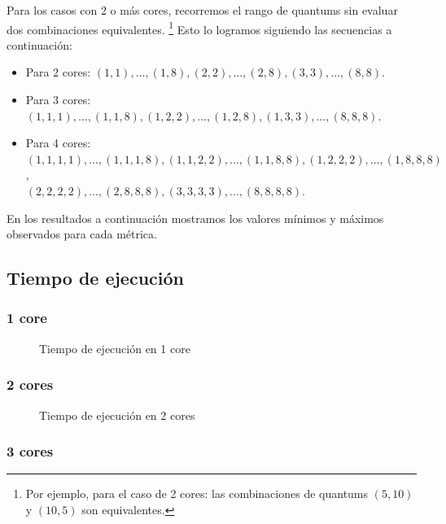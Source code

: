 \documentclass[a4paper,10pt,twoside]{article}
\begin{document}
Para los casos con 2 o más cores, recorremos el rango de quantums sin evaluar dos combinaciones equivalentes. \footnote{Por ejemplo, para el caso de 2 cores: las combinaciones de quantums $(5, 10)$ y $(10, 5)$ son equivalentes.} Esto lo logramos siguiendo las secuencias a continuación:

\begin{itemize}
	\item{
		Para 2 cores:
		$(1, 1), \ldots, (1, 8),
		 (2, 2), \ldots, (2, 8),
		 (3, 3), \ldots, (8, 8)$.
	}
	\item{
		Para 3 cores:
		$(1, 1, 1), \ldots, (1, 1, 8),
		 (1, 2, 2), \ldots, (1, 2, 8),
		 (1, 3, 3), \ldots, (8, 8, 8)$.
	}	
	\item{
		Para 4 cores:
		$(1, 1, 1, 1), \ldots, (1, 1, 1, 8),
		 (1, 1, 2, 2), \ldots, (1, 1, 8, 8),
		 (1, 2, 2, 2), \ldots, (1, 8, 8, 8)$, \\
		\hspace*{5.7em}
		$(2, 2, 2, 2), \ldots, (2, 8, 8, 8),
		 (3, 3, 3, 3), \ldots, (8, 8, 8, 8)$.
	}
\end{itemize}

En los resultados a continuación mostramos los valores mínimos y máximos observados para cada métrica.


\subsection{Tiempo de ejecución}


\subsubsection{1 core}

\begin{figure}[H]
	\centering
	
	\caption{Tiempo de ejecución en 1 core}
\end{figure}


\subsubsection{2 cores}

\begin{figure}[H]
	\centering
	
	\caption{Tiempo de ejecución en 2 cores}
\end{figure}


\subsubsection{3 cores}
\end{document}
